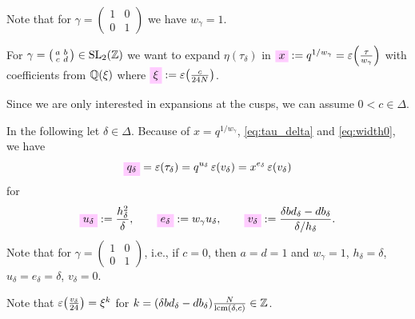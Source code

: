 \documentclass{article}
\begin{document}
Note that for
$\gamma=\left(\begin{smallmatrix}1&0\\0&1\end{smallmatrix}\right)$ we
have $w_\gamma=1$.


For
$\gamma =
\bigl(
\begin{smallmatrix}
  a & b\\
  c & d
\end{smallmatrix}
\bigr) \in \SL2Z$ we want to expand $\eta(\tau_\delta)$ in
$\defineNotation[x]{x}:=q^{1/w_\gamma}=\unityPower{\frac{\tau}{w_\gamma}}$
with coefficients from $\mathbb{Q}(\xi)$ where
$\defineNotation[xi]{\xi} := \unityPower{\frac{c}{24N}}$.

Since we are only interested in expansions at the cusps, we can assume
$0<c\in\Delta$.

In the following let $\delta \in \Delta$. Because of
$x=q^{1/w_\gamma}$, \eqref{eq:tau_delta} and \eqref{eq:width0}, we
have
\begin{gather}
  \defineNotation[q-delta]{q_\delta} = \unityPower{\tau_\delta}
  = q^{u_\delta} \, \unityPower{v_\delta}
  = x^{e_\delta} \, \unityPower{v_\delta}
\label{eq:q_delta}
\end{gather}
for
\begin{gather}
  \defineNotation[u-delta]{u_\delta} :=
  \frac{h_\delta^2}{\delta},
  \qquad
  \defineNotation[e-delta]{e_\delta} :=
  w_\gamma u_\delta,
  \qquad
  \defineNotation[v-delta]{v_\delta} :=
  \frac{\delta b d_\delta-d b_\delta}{\delta/h_\delta}.
  \label{eq:uv_delta}
\end{gather}
Note that for
$\gamma=\left(\begin{smallmatrix}1&0\\0&1\end{smallmatrix}\right)$,
i.e., if $c=0$, then $a=d=1$ and
$w_\gamma=1$,
$h_\delta=\delta$, $u_\delta=e_\delta=\delta$, $v_\delta=0$.

%
Note that $\varepsilon\!\left(\frac{v_\delta}{24}\right) = \xi^k$ for
$k = (\delta b d_\delta - d b_\delta) \frac{N}{\operatorname{lcm}(\delta,c)}\in \mathbb{Z}$.
\end{document}
